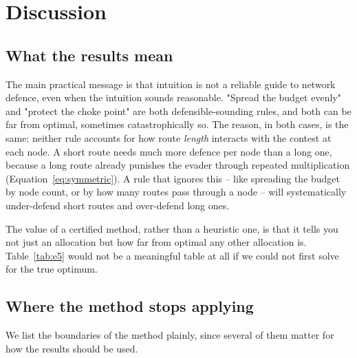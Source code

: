 \documentclass[11pt,a4paper]{article}
\theoremstyle{plain}
\theoremstyle{definition}
\begin{document}
\section{Discussion}
\label{sec:discussion}

\subsection{What the results mean}

The main practical message is that intuition is not a reliable guide to
network defence, even when the intuition sounds reasonable. "Spread the
budget evenly" and "protect the choke point" are both defensible-sounding
rules, and both can be far from optimal, sometimes catastrophically so.
The reason, in both cases, is the same: neither rule accounts for how
route \emph{length} interacts with the contest at each node. A short
route needs much more defence per node than a long one, because a long
route already punishes the evader through repeated multiplication
(Equation~\ref{eq:symmetric}). A rule that ignores this -- like spreading
the budget by node count, or by how many routes pass through a node --
will systematically under-defend short routes and over-defend long ones.

The value of a certified method, rather than a heuristic one, is that it
tells you not just an allocation but how far from optimal any other
allocation is. Table~\ref{tab:e5} would not be a meaningful table at all
if we could not first solve for the true optimum.

\subsection{Where the method stops applying}

We list the boundaries of the method plainly, since several of them
matter for how the results should be used.
\end{document}
